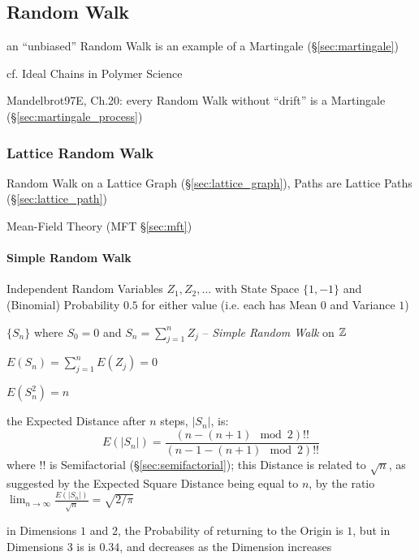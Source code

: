 \subsection{Random Walk}\label{sec:random_walk}


an ``unbiased'' Random Walk is an example of a Martingale
(\S\ref{sec:martingale})

cf. Ideal Chains in Polymer Science

Mandelbrot97E, Ch.20: every Random Walk without ``drift'' is a Martingale
(\S\ref{sec:martingale_process})



\subsubsection{Lattice Random Walk}\label{sec:lattice_random_walk}

Random Walk on a Lattice Graph (\S\ref{sec:lattice_graph}), Paths are Lattice
Paths (\S\ref{sec:lattice_path})

\fist Mean-Field Theory (MFT \S\ref{sec:mft})



\paragraph{Simple Random Walk}\label{sec:simple_random_walk}\hfill

Independent Random Variables $Z_1, Z_2, \ldots$ with State Space $\{1, -1\}$ and
(Binomial) Probability $0.5$ for either value (i.e. each has Mean $0$ and
Variance $1$)

$\{ S_n \}$ where $S_0 = 0$ and $S_n = \sum_{j=1}^n Z_j$ --
\emph{Simple Random Walk} on $\mathbb{Z}$

$E(S_n) = \sum_{j=1}^n E(Z_j) = 0$

$E(S_n^2) = n$

the Expected Distance after $n$ steps, $|S_n|$, is:
\[
  E(|S_n|) = \frac{(n - (n+1)\mod{2})!!}{(n - 1 - (n+1)\mod{2})!!}
\]
where $!!$ is Semifactorial (\S\ref{sec:semifactorial}); this Distance is
related to $\sqrt{n}$, as suggested by the Expected Square Distance being equal
to $n$, by the ratio
$\lim_{n\to\infty} \frac{E(|S_n|)}{\sqrt{n}} = \sqrt{2/\pi}$

in Dimensions $1$ and $2$, the Probability of returning to the Origin is $1$,
but in Dimensions $3$ is is $0.34$, and decreases as the Dimension increases

